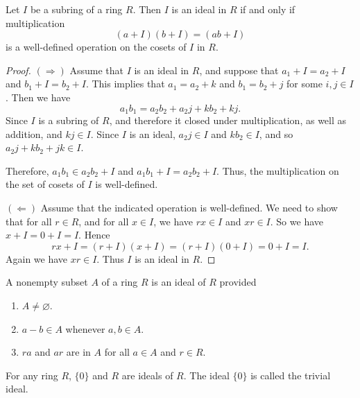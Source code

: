 \begin{lemma}
    Let $I$ be a subring of a ring $R$. Then $I$ is an ideal in $R$ if and only if multiplication 
    \[
        (a + I)(b + I) = (ab + I)
    \]
    is a well-defined operation on the cosets of $I$ in $R$.
\end{lemma}
\begin{proof}
    $(\Rightarrow)$ Assume that $I$ is an ideal in $R$, and suppose 
    that $a_1 + I = a_2 + I$ and $b_1 + I = b_2 + I$. This implies that $a_1 = a_2 + k$ and 
    $b_1 = b_2 + j$ for some $i, j \in I$. Then we have 
    \[
        a_1 b_1 = a_2 b_2 + a_2 j + kb_2 + kj.
    \]
    Since $I$ is a subring of $R$, and therefore it closed under multiplication, as well as addition, and $kj \in I$. 
    Since $I$ is an ideal, $a_2 j \in I$ and $kb_2 \in I$, and so $a_2 j + kb_2 + jk \in I$. 

    Therefore, $a_1b_1 \in a_2b_2 + I$ and $a_1b_1 + I = a_2b_2 + I$. Thus, the multiplication on the set 
    of cosets of $I$ is well-defined.

    $(\Leftarrow)$ Assume that the indicated operation is well-defined. We need to show that for all $r \in R$, and 
    for all $x \in I$, we have $rx \in I$ and $xr \in I$. So we have $x + I = 0 + I = I$. Hence 
    \[
        rx + I = (r + I)(x + I) = (r + I)(0 + I) = 0 + I = I.
    \]
    Again we have $xr \in I$. Thus $I$ is an ideal in $R$.
\end{proof}

\begin{theorem}
    A nonempty subset $A$ of a ring $R$ is an ideal of $R$ provided
    \begin{enumerate}
        \item $A \neq \varnothing$.
        \item $a - b \in A$ whenever $a, b \in A$.
        \item $ra$ and $ar$ are in $A$ for all $a \in A$ and $r \in R$.
    \end{enumerate}
\end{theorem}

\begin{example}
    For any ring $R$, $\{0 \}$ and $R$ are ideals of $R$. The ideal $\{ 0 \}$ is called the trivial ideal.
\end{example}

